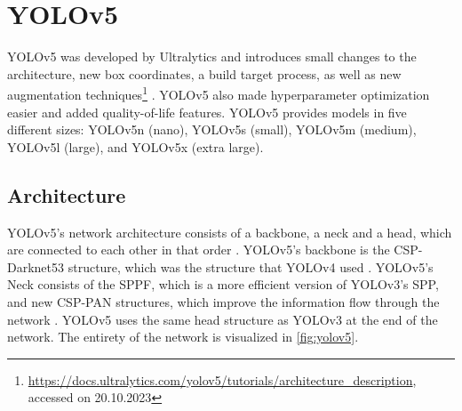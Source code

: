 \documentclass[10pt]{book}
\newcommand{\figureref}[1]{\autoref{#1}}
\begin{document}

\section{YOLOv5}

\ac{YOLO}v5 was developed by Ultralytics and introduces small changes to the architecture, new box coordinates, a build target process, as well as new augmentation techniques\footnote{\url{https://docs.ultralytics.com/yolov5/tutorials/architecture_description}, accessed on 20.10.2023} \cite{gjocher2022yolov5,terven2023comprehensive}. \ac{YOLO}v5 also made hyperparameter optimization easier and added quality-of-life features. \ac{YOLO}v5 provides models in five different sizes: \ac{YOLO}v5n (nano), \ac{YOLO}v5s (small), \ac{YOLO}v5m (medium), \ac{YOLO}v5l (large), and \ac{YOLO}v5x (extra large).

\subsection{Architecture}

\ac{YOLO}v5's network architecture consists of a backbone, a neck and a head, which are connected to each other in that order \cite{jani2023model}. \ac{YOLO}v5's backbone is the CSP-Darknet53 structure, which was the structure that \ac{YOLO}v4 used \cite{bochkovskiy2020yolov4}. \ac{YOLO}v5's Neck consists of the \ac{SPPF}, which is a more efficient version of \ac{YOLO}v3's \ac{SPP}, and new \ac{CSP-PAN} structures, which improve the information flow through the network \cite{liu2018path}. \ac{YOLO}v5 uses the same head structure as \ac{YOLO}v3 at the end of the network. The entirety of the network is visualized in \figureref{fig:yolov5}.
\end{document}
